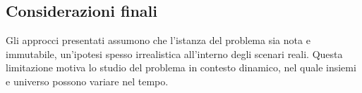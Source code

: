 \subsection*{Considerazioni finali}

Gli approcci presentati assumono che l'istanza del problema sia nota e immutabile, un'ipotesi spesso irrealistica all'interno degli scenari reali.
Questa limitazione motiva lo studio del problema in contesto dinamico, nel quale insiemi e universo possono variare nel tempo.